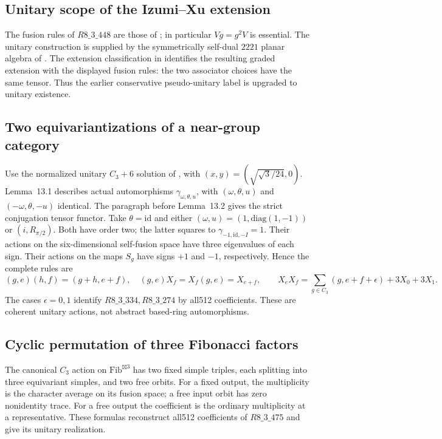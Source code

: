 \subsection{Unitary scope of the Izumi--Xu extension}
The fusion rules of $R8\_3\_448$ are those of \cite[Appendix~A.6.1]{CMS}; in particular $Vg=g^2V$ is essential. The unitary construction is supplied by the symmetrically self-dual $2221$ planar algebra of \cite[Section~5.1, Theorem~5.5]{MorrisonPenneysSpokes}. The extension classification in \cite[Theorem~4.9, Remarks~4.10--4.11]{GJSCyclic} identifies the resulting graded extension with the displayed fusion rules: the two associator choices have the same tensor. Thus the earlier conservative pseudo-unitary label is upgraded to unitary existence.

\subsection{Two equivariantizations of a near-group category}
Use the normalized unitary $C_3+6$ solution of \cite[Example~13.10]{IzumiNear}, with $(x,y)=(\sqrt{\sqrt3/24},0)$. Lemma~13.1 describes actual automorphisms $\gamma_{\omega,\theta,u}$, with $(\omega,\theta,u)$ and $(-\omega,\theta,-u)$ identical. The paragraph before Lemma~13.2 gives the strict conjugation tensor functor. Take $\theta=\mathrm{id}$ and either $(\omega,u)=(1,\mathrm{diag}(1,-1))$ or $(i,R_{\pi/2})$. Both have order two; the latter squares to $\gamma_{-1,\mathrm{id},-I}=1$. Their actions on the six-dimensional self-fusion space have three eigenvalues of each sign. Their actions on the maps $S_g$ have signs $+1$ and $-1$, respectively. Hence the complete rules are
\[
 (g,e)(h,f)=(g+h,e+f),\quad (g,e)X_f=X_f(g,e)=X_{e+f},
 \qquad X_eX_f=\sum_{g\in C_3}(g,e+f+\epsilon)+3X_0+3X_1.
\]
The cases $\epsilon=0,1$ identify $R8\_3\_334,R8\_3\_274$ by all512 coefficients. These are coherent unitary actions, not abstract based-ring automorphisms.

\subsection{Cyclic permutation of three Fibonacci factors}
The canonical $C_3$ action on $\mathrm{Fib}^{\boxtimes3}$ has two fixed simple triples, each splitting into three equivariant simples, and two free orbits. For a fixed output, the multiplicity is the character average on its fusion space; a free input orbit has zero nonidentity trace. For a free output the coefficient is the ordinary multiplicity at a representative. These formulas reconstruct all512 coefficients of $R8\_3\_475$ and give its unitary realization.

